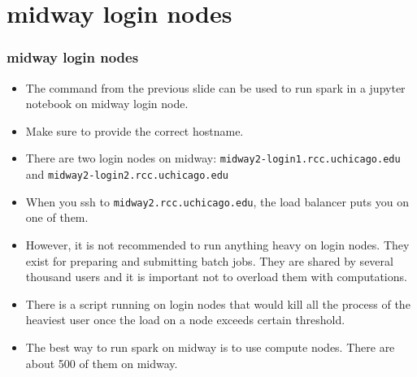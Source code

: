 \documentclass{beamer}
\begin{document}
\section{midway login nodes}
\begin{frame}[fragile]
  \frametitle{midway login nodes}
  
  \begin{itemize}
  \item The command from the previous slide can be used to run spark in a jupyter notebook on midway login node.
  \item Make sure to provide the correct hostname.
  \item There are two login nodes on midway: {\color{mycolorcli}\verb|midway2-login1.rcc.uchicago.edu|} and
    {\color{mycolorcli}\verb|midway2-login2.rcc.uchicago.edu|}
  \item When you ssh to {\color{mycolorcli}\verb|midway2.rcc.uchicago.edu|}, the load balancer puts you on one of them.
  \item However, it is not recommended to run anything heavy on login nodes. They exist for preparing and submitting
    batch jobs. They are shared by several thousand users and it is important not to overload them with computations.
  \item There is a script running on login nodes that would kill all the process of the heaviest user once the load
    on a node exceeds certain threshold.
  \item The best way to run spark on midway is to use compute nodes. There are about 500 of them on midway.
  \end{itemize}

\end{frame}
\end{document}

